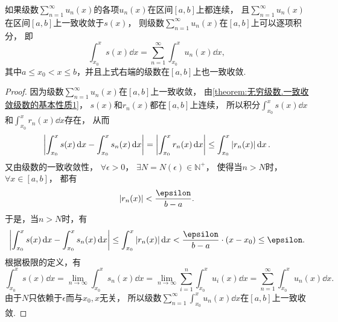 \begin{property}\label{theorem:无穷级数.一致收敛级数的基本性质3}
如果级数\(\sum\limits_{n=1}^\infty u_n(x)\)的各项\(u_n(x)\)在区间\([a,b]\)上都连续，
且\(\sum\limits_{n=1}^\infty u_n(x)\)在区间\([a,b]\)上一致收敛于\(s(x)\)，
则级数\(\sum\limits_{n=1}^\infty u_n(x)\)在\([a,b]\)上可以逐项积分，
即\[
	\int_{x_0}^x s(x) \dd{x}
	= \sum\limits_{n=1}^\infty \int_{x_0}^x u_n(x) \dd{x},
\]
其中\(a \leq x_0 < x \leq b\)，并且上式右端的级数在\([a,b]\)上也一致收敛.
\begin{proof}
因为级数\(\sum\limits_{n=1}^\infty u_n(x)\)在\([a,b]\)上一致收敛，
由\cref{theorem:无穷级数.一致收敛级数的基本性质1}，
\(s(x)\)和\(r_n(x)\)都在\([a,b]\)上连续，
所以积分\(\int_{x_0}^x s(x) \dd{x}\)和\(\int_{x_0}^x r_n(x) \dd{x}\)存在，
从而\[
	\abs{\int_{x_0}^x s(x) \dd{x} - \int_{x_0}^x s_n(x) \dd{x}}
	= \abs{\int_{x_0}^x r_n(x) \dd{x}}
	\leq \int_{x_0}^x \abs{r_n(x)} \dd{x}.
\]
又由级数的一致收敛性，
\(\forall\epsilon>0\)，
\(\exists N = N(\epsilon) \in \mathbb{N}^+\)，
使得当\(n > N\)时，
\(\forall x \in [a,b]\)，
都有\[
	\abs{r_n(x)} < \frac{\epsilon}{b-a}.
\]
于是，当\(n > N\)时，有\[
	\abs{\int_{x_0}^x s(x) \dd{x} - \int_{x_0}^x s_n(x) \dd{x}}
	\leq \int_{x_0}^x \abs{r_n(x)} \dd{x}
	< \frac{\epsilon}{b-a} \cdot (x-x_0)
	\leq \epsilon.
\]
根据极限的定义，有\[
	\int_{x_0}^x s(x) \dd{x}
	= \lim\limits_{n\to\infty} \int_{x_0}^x s_n(x) \dd{x}
	= \lim\limits_{n\to\infty} \sum\limits_{i=1}^n \int_{x_0}^x u_i(x) \dd{x}
	= \sum\limits_{n=1}^\infty \int_{x_0}^x u_n(x) \dd{x}.
\]
由于\(N\)只依赖于\(\epsilon\)而与\(x_0,x\)无关，
所以级数\(\sum\limits_{n=1}^\infty \int_{x_0}^x u_n(x) \dd{x}\)在\([a,b]\)上一致收敛.
\end{proof}
\end{property}

